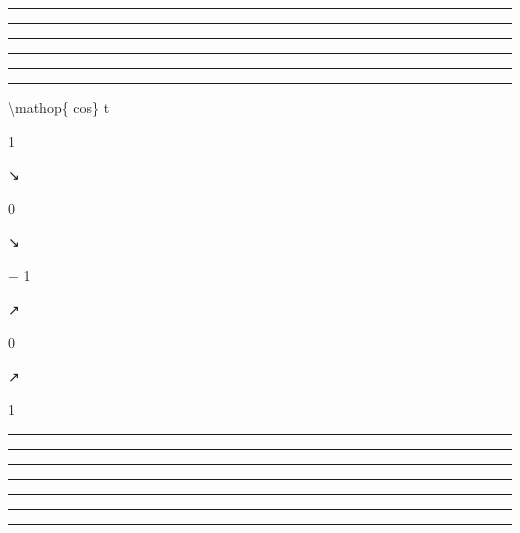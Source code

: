 \documentclass[]{article}
\begin{document}
\begin{center}\rule{3in}{0.4pt}\end{center}

\begin{center}\rule{3in}{0.4pt}\end{center}

\begin{center}\rule{3in}{0.4pt}\end{center}

\begin{center}\rule{3in}{0.4pt}\end{center}

\begin{center}\rule{3in}{0.4pt}\end{center}

\begin{center}\rule{3in}{0.4pt}\end{center}

\textbackslash{}mathop\{ cos\} t

1

↘

0

↘

− 1

↗

0

↗

1

\begin{center}\rule{3in}{0.4pt}\end{center}

\begin{center}\rule{3in}{0.4pt}\end{center}

\begin{center}\rule{3in}{0.4pt}\end{center}

\begin{center}\rule{3in}{0.4pt}\end{center}

\begin{center}\rule{3in}{0.4pt}\end{center}

\begin{center}\rule{3in}{0.4pt}\end{center}

\begin{center}\rule{3in}{0.4pt}\end{center}
\end{document}
